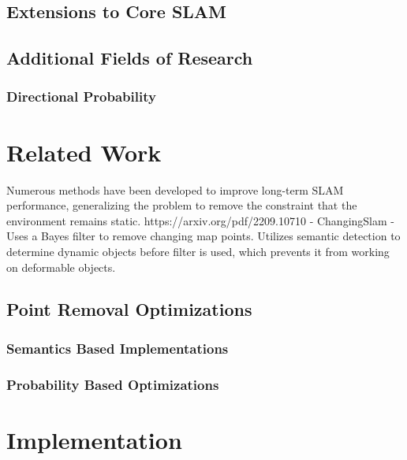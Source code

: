 \documentclass[12pt]{article}
\begin{document}
\subsection{Extensions to Core SLAM}

\subsection{Additional Fields of Research}

\subsubsection{Directional Probability}

\section{Related Work}

Numerous methods have been developed to improve long-term SLAM performance, generalizing the problem to remove the constraint that the environment remains static.
https://arxiv.org/pdf/2209.10710 - ChangingSlam - Uses a Bayes filter to remove changing map points. Utilizes semantic detection to determine dynamic objects before filter is used, which prevents it from working on deformable objects.

\subsection{Point Removal Optimizations}

\subsubsection{Semantics Based Implementations}

\subsubsection{Probability Based Optimizations}

\section{Implementation}
\end{document}
